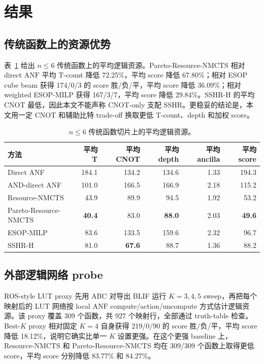 \documentclass[UTF8,fontset=macnew,11pt]{ctexart}
\newcommand{\method}{Resource-NMCTS}
\newcommand{\anf}{\ensuremath{\mathrm{ANF}}}
\newcommand{\ttable}{truth-table}
\begin{document}
\section{结果}

\subsection{传统函数上的资源优势}

表~\ref{tab:traditional} 给出 $n\leq6$ 传统函数上的平均逻辑资源。Pareto-\method{} 相对 direct \anf{} 平均 T-count 降低 72.25\%，平均 score 降低 67.80\%；相对 ESOP cube beam 获得 174/0/3 的 score 胜/负/平，平均 score 降低 36.09\%；相对 weighted ESOP-MILP 获得 167/3/7，平均 score 降低 29.84\%。SSHR-H 的平均 CNOT 最低，因此本文不能声称 CNOT-only 支配 SSHR。更稳妥的结论是，本文用一定 CNOT 和辅助比特 trade-off 换取更低 T-count、depth 和加权 score。

\begin{table}[H]
\centering
\small
\caption{$n\leq6$ 传统函数切片上的平均逻辑资源。}
\label{tab:traditional}
\begin{tabular}{lrrrrr}
\toprule
方法 & 平均 T & 平均 CNOT & 平均 depth & 平均 ancilla & 平均 score \\
\midrule
Direct ANF & 184.1 & 134.2 & 134.6 & 1.33 & 194.3 \\
AND-direct ANF & 101.0 & 166.5 & 166.9 & 2.18 & 115.2 \\
\method{} & 43.9 & 89.9 & 94.5 & 1.92 & 53.2 \\
Pareto-\method{} & \textbf{40.4} & 83.0 & \textbf{88.0} & 2.03 & \textbf{49.6} \\
ESOP-MILP & 83.6 & 133.5 & 159.6 & 2.32 & 96.7 \\
SSHR-H & 81.0 & \textbf{67.6} & 88.7 & 1.36 & 88.2 \\
\bottomrule
\end{tabular}
\end{table}

\subsection{外部逻辑网络 probe}

ROS-style LUT proxy 先用 ABC 对导出 BLIF 运行 $K=3,4,5$ sweep，再把每个映射后的 LUT 网络按 local \anf{} compute/action/uncompute 方式估计逻辑资源。该 proxy 覆盖 309 个函数，共 927 个映射行，全部通过 \ttable{} 检查。Best-$K$ proxy 相对固定 $K=4$ 自身获得 219/0/90 的 score 胜/负/平，平均 score 降低 18.12\%，说明它确实比单一 $K$ 设置更强。在这个更强 baseline 上，\method{} 和 Pareto-\method{} 均在 309/309 个函数上取得更低 score，平均 score 分别降低 83.77\% 和 84.27\%。
\end{document}
